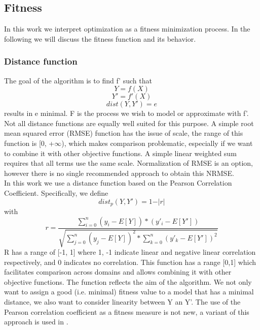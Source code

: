 \subsection{Fitness}
In this work we interpret optimization as a fitness minimization process. In the following we will discuss the fitness function and its behavior.
\subsubsection{Distance function}
The goal of the algorithm is to find f' such that
\[Y = f(X)\]
\[Y' = f'(X)\]
\[dist(Y, Y') = e\]
results in e minimal. F is the process we wish to model or approximate with f'.\\
Not all distance functions are equally well suited for this purpose. A simple root mean squared error (RMSE) function has the issue of scale, the range of this function is [0, +$\infty$), which makes comparison problematic, especially if we want to combine it with other objective functions. A simple linear weighted sum requires that all terms use the same scale.
Normalization of RMSE is an option, however there is no single recommended approach to obtain this NRMSE. \\
In this work we use a distance function based on the Pearson Correlation Coefficient. Specifically, we define
\[
dist_p(Y, Y') = 1 - \vert r \vert
\]
with
\[
r = \frac{\sum_{i=0}^{n}{(y_i-E[Y])*(y'_i-E[Y'])}}{\sqrt{\sum_{j=0}^{n}{(y_j-E[Y])^2}*\sum_{k=0}^{n}{(y'_k-E[Y'])^2}}}
\]
R has a range of [-1, 1] where 1, -1 indicate linear and negative linear correlation respectively, and 0 indicates no correlation.
This function has a range [0,1] which facilitates comparison across domains and allows combining it with other objective functions.
The function reflects the aim of the algorithm. We not only want to assign a good (i.e. minimal) fitness value to a model that has a minimal distance, we also want to consider linearity between Y an Y'. The use of the Pearson correlation coefficient as a fitness measure is not new, a variant of this approach is used in \citep{pearson}.

